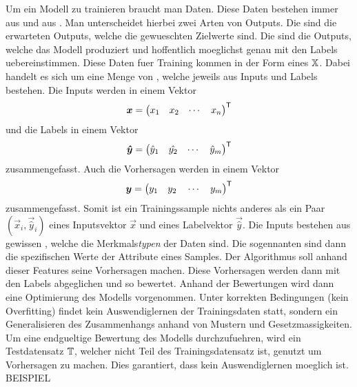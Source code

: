 Um ein Modell zu trainieren braucht man Daten. Diese Daten bestehen immer aus
 und aus . Man unterscheidet hierbei zwei Arten
von Outputs. Die  sind die erwarteten Outputs, welche die
gewueschten Zielwerte sind. Die  sind die Outputs, welche
das Modell produziert und hoffentlich moeglichst genau mit den Labels
uebereinstimmen.
\para{}
Diese Daten fuer Training kommen in der Form eines  $\mathbb{X}$.
Dabei handelt es sich um eine Menge von ,
welche jeweils aus Inputs und Labels bestehen.
Die Inputs werden in einem Vektor
\[ \bm{x} = \begin{pmatrix} x_1 & x_2 & \cdots & x_n \end{pmatrix}^{\mathsf{T}} \]
und die Labels in einem Vektor
\[ \bm{\hat{y}} = \begin{pmatrix} \hat{y}_1 & \hat{y_2} & \cdots & \hat{y}_m \end{pmatrix}^{\mathsf{T}} \]
zusammengefasst. Auch die Vorhersagen werden in einem Vektor
\[\bm{y} = \begin{pmatrix} y_1 \quad y_2 \quad \cdots \quad y_m \end{pmatrix}^{\mathsf{T}} \]
zusammengefasst.
Somit ist ein Trainingssample nichts anderes als ein Paar
$(\vec{x}_i,\vec{\hat{y}}_i)$ eines Inputsvektor $\vec{x}$ und eines Labelvektor
$\vec{\hat{y}}$.
\para{}
Die Inputs bestehen aus gewissen , welche die
Merkmals\textit{typen} der Daten sind. Die sogennanten  sind
dann die spezifischen Werte der Attribute eines Samples. Der Algorithmus soll
anhand dieser Features seine Vorhersagen machen.
Diese Vorhersagen werden dann mit den Labels abgeglichen und so bewertet.
Anhand der Bewertungen wird dann eine Optimierung des Modells vorgenommen.
Unter korrekten Bedingungen (kein Overfitting) findet kein Auswendiglernen der Trainingsdaten statt,
sondern ein Generalisieren des Zusammenhangs anhand von Mustern und Gesetzmassigkeiten.
\para{}
Um eine endgueltige Bewertung des Modells durchzufuehren, wird ein Testdatensatz
$\mathbb{T}$, welcher nicht Teil des Trainingsdatensatz ist, genutzt um Vorhersagen zu machen.
Dies garantiert, dass kein Auswendiglernen moeglich ist.
\para{}
BEISPIEL


